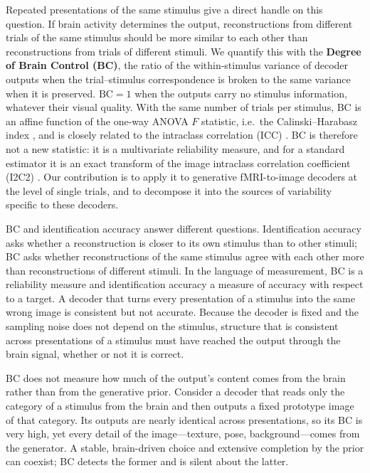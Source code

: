 \documentclass[11pt,a4paper]{article}
\begin{document}
Repeated presentations of the same stimulus give a direct handle on this
question. If brain activity determines the output, reconstructions from
different trials of the same stimulus should be more similar to each other than
reconstructions from trials of different stimuli. We quantify this with the
\textbf{Degree of Brain Control (BC)}, the ratio of the within-stimulus variance
of decoder outputs when the trial--stimulus correspondence is broken to the same
variance when it is preserved. $\mathrm{BC}=1$ when the outputs carry no
stimulus information, whatever their visual quality. With the same number of
trials per stimulus, BC is an affine function of the one-way ANOVA $F$
statistic, i.e.\ the Calinski--Harabasz index \citep{calinski1974}, and is
closely related to the intraclass correlation (ICC) \citep{shrout1979}. BC is
therefore not a new statistic: it is a multivariate reliability measure, and
for a standard estimator it is an exact transform of the image intraclass
correlation coefficient (I2C2) \citep{shou2013}. Our contribution is to apply
it to generative fMRI-to-image decoders at the level of single trials, and to
decompose it into the sources of variability specific to these decoders.

BC and identification accuracy answer different questions. Identification
accuracy asks whether a reconstruction is closer to its own stimulus than to
other stimuli; BC asks whether reconstructions of the same stimulus agree with
each other more than reconstructions of different stimuli. In the language of
measurement, BC is a reliability measure and identification accuracy a measure
of accuracy with respect to a target. A decoder that turns every presentation of
a stimulus into the same wrong image is consistent but not accurate. Because the
decoder is fixed and the sampling noise does not depend on the stimulus,
structure that is consistent across presentations of a stimulus must have
reached the output through the brain signal, whether or not it is correct.

BC does not measure how much of the output's content comes from the brain
rather than from the generative prior. Consider a decoder that reads only the
category of a stimulus from the brain and then outputs a fixed prototype image
of that category. Its outputs are nearly identical across presentations, so its
BC is very high, yet every detail of the image---texture, pose,
background---comes from the generator. A stable, brain-driven choice and
extensive completion by the prior can coexist; BC detects the former and is
silent about the latter.
\end{document}
